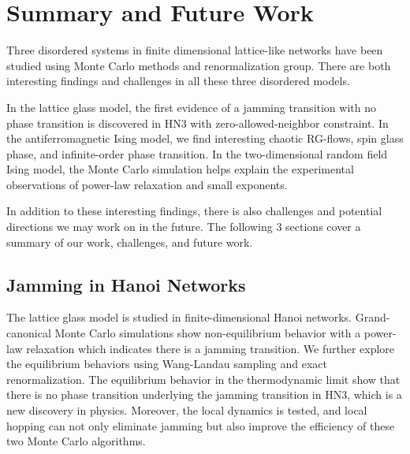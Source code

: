 

\chapter{Summary and Future Work}
\label{chap-summary}

Three disordered systems in finite dimensional lattice-like networks have been studied using Monte Carlo methods and renormalization group. There are both interesting findings and challenges in all these three disordered models. 

In the lattice glass model, the first evidence of a jamming transition with no phase transition is discovered in HN3 with zero-allowed-neighbor constraint. In the antiferromagnetic Ising model, we find interesting chaotic RG-flows, spin glass phase, and infinite-order phase transition. In the two-dimensional random field Ising model, the Monte Carlo simulation helps explain the experimental observations of power-law relaxation and small exponents. 

In addition to these interesting findings, there is also challenges and potential directions we may work on in the future. The following 3 sections cover a summary of our work, challenges, and future work.

\section{Jamming in Hanoi Networks}
The lattice glass model is studied in finite-dimensional Hanoi networks. Grand-canonical Monte Carlo simulations show non-equilibrium behavior with a power-law relaxation which indicates there is a jamming transition. We further explore the equilibrium behaviors using Wang-Landau sampling and exact renormalization. The equilibrium behavior in the thermodynamic limit show that there is no phase transition underlying the jamming transition in HN3, which is a new discovery in physics. Moreover, the local dynamics is tested, and local hopping can not only eliminate jamming but also improve the efficiency of these two Monte Carlo algorithms.  

